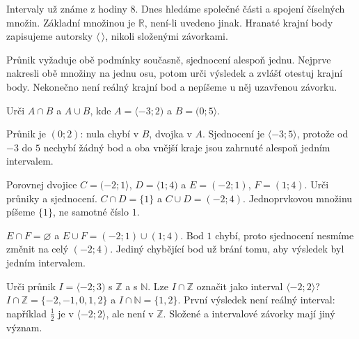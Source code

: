 \documentclass[11pt,a4paper]{article}
\begin{document}
Intervaly už známe z hodiny 8. Dnes hledáme společné části a spojení
číselných množin. Základní množinou je $\mathbb R$, není-li uvedeno jinak.
Hranaté krajní body zapisujeme autorsky $\langle\,\rangle$, nikoli složenými závorkami.

Průnik vyžaduje obě podmínky současně, sjednocení alespoň jednu.
Nejprve nakresli obě množiny na jednu osu, potom urči výsledek a zvlášť
otestuj krajní body. Nekonečno není reálný krajní bod a nepíšeme u něj uzavřenou závorku.

\begin{prikladReseniBox}[title={P1: překrývající se intervaly}]
Urči $A\cap B$ a $A\cup B$, kde $A=\langle-3;2)$ a $B=(0;5\rangle$.
\tcblower
\begin{center}
\end{center}
Průnik je $(0;2)$: nula chybí v $B$, dvojka v $A$.
Sjednocení je $\langle-3;5\rangle$, protože od $-3$ do $5$ nechybí žádný bod
a oba vnější kraje jsou zahrnuté alespoň jedním intervalem.
\end{prikladReseniBox}

\begin{prikladReseniBox}[title={P2: dotyk v jediném bodě},breakable=false]
Porovnej dvojice $C=(-2;1\rangle$, $D=\langle1;4)$
a $E=(-2;1)$, $F=(1;4)$. Urči průniky a sjednocení.
\tcblower
$C\cap D=\{1\}$ a $C\cup D=(-2;4)$.
Jednoprvkovou množinu píšeme $\{1\}$, ne samotné číslo $1$.

$E\cap F=\varnothing$ a $E\cup F=(-2;1)\cup(1;4)$.
Bod $1$ chybí, proto sjednocení nesmíme změnit na celý $(-2;4)$.
Jediný chybějící bod už brání tomu, aby výsledek byl jedním intervalem.
\end{prikladReseniBox}

\begin{prikladReseniBox}[title={P3: interval není výčet celých čísel},breakable=false]
Urči průnik $I=\langle-2;3)$ s $\mathbb Z$ a s $\mathbb N$.
Lze $I\cap\mathbb Z$ označit jako interval $\langle-2;2\rangle$?
\tcblower
$I\cap\mathbb Z=\{-2,-1,0,1,2\}$ a $I\cap\mathbb N=\{1,2\}$.
První výsledek není reálný interval: například $\frac12$ je v $\langle-2;2\rangle$,
ale není v $\mathbb Z$. Složené a intervalové závorky mají jiný význam.
\end{prikladReseniBox}
\end{document}
